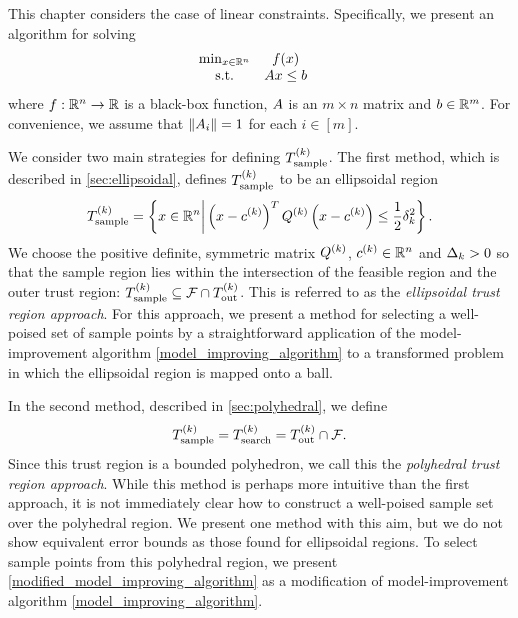 This chapter considers the case of linear constraints.
Specifically, we present an algorithm for solving
\begin{align}
\label{eq:DFO-linear}
\begin{array}{ccl} \min_{x \in \mathbb R^n} & f(x) \\
\textrm{s.t.} & {A} x \le {b} & 
\end{array}
\end{align}
where $f:\mathbb R^n\rightarrow\mathbb R$ is a black-box function, 
${A}$ is an $m \times n$ matrix and ${b} \in \mathbb R^m$.
For convenience, we assume that $\left\|{A}_i\right\| = 1$ for each $i \in [m]$.

We consider two main strategies for defining ${T_{\text{sample}}^{(k)}}$.
The first method,  which is described in \cref{sec:ellipsoidal},  
defines ${T_{\text{sample}}^{(k)}}$ to be an ellipsoidal region
\begin{align}
\label{define_the_sample_region}
{T_{\text{sample}}^{(k)}} = \left\{x \in \mathbb R^n \bigg | \left(x - c^{(k)}\right)^T {Q^{(k)}} \left(x - c^{(k)}\right) \le \frac 1 2 \delta_k^2 \right\}.
\end{align}
We choose the positive definite, symmetric matrix ${Q^{(k)}}$, $c^{(k)} \in \mathbb R^n$ and $\Delta_k > 0$ so that
the sample region lies within the intersection of the feasible region and the outer trust region:
${T_{\text{sample}}^{(k)}} \subseteq {\mathcal F} \cap {T_{\text{out}}^{(k)}}$.
This is referred to as the {\em ellipsoidal trust region approach}.
For this approach, we present a method for selecting a well-poised set of sample points by a straightforward application 
of the model-improvement algorithm \cref{model_improving_algorithm} to a transformed problem in which 
the ellipsoidal region is mapped onto a ball.




In the second method,  described in \cref{sec:polyhedral}, we define 
\begin{align*}
{T_{\text{sample}}^{(k)}} = {T_{\text{search}}^{(k)}} = {T_{\text{out}}^{(k)}} \cap {\mathcal F}.
\end{align*}
Since this trust region is a bounded polyhedron,  we call this the {\em polyhedral trust region approach}.
While this method is perhaps more intuitive than the first approach,
it is not immediately clear how to construct a well-poised sample set over the polyhedral region.
We present one method with this aim, but we do not show equivalent error bounds as those found for ellipsoidal regions.
To select sample points from this polyhedral region, 
we present \cref{modified_model_improving_algorithm} as a modification of model-improvement algorithm \cref{model_improving_algorithm}.


